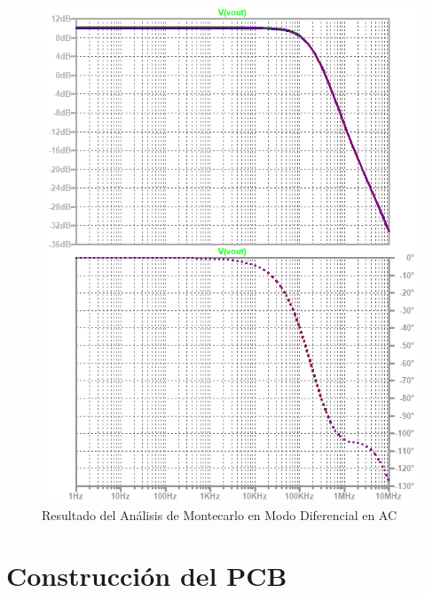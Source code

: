 \begin{figure}[ht]
\begin{center}
\includegraphics[scale=1]{res/spice/spice_dm_ac_bode_mc.png}
\caption{Resultado del Análisis de Montecarlo en Modo Diferencial en AC}
\label{e4:fig_spice_dm_ac_mc}
\end{center}
\end{figure}

\newpage

\section{Construcción del PCB}

